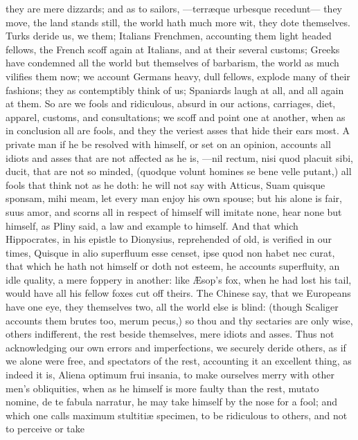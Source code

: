 {they are mere dizzards; and as to sailors, ---terr\ae{}que urbesque
recedunt--- they move, the land stands still, the world hath much more
wit, they dote themselves. Turks deride us, we them; Italians
Frenchmen, accounting them light headed fellows, the French scoff again
at Italians, and at their several customs; Greeks have condemned all
the world but themselves of barbarism, the world as much vilifies them
now; we account Germans heavy, dull fellows, explode many of their
fashions; they as contemptibly think of us; Spaniards laugh at all, and
all again at them. So are we fools and ridiculous, absurd in our
actions, carriages, diet, apparel, customs, and consultations; we 
scoff and point one at another, when as in conclusion all are fools,
 and they the veriest asses that hide their ears most. A private
man if he be resolved with himself, or set on an opinion, accounts all
idiots and asses that are not affected as he is, ---nil rectum,
nisi quod placuit sibi, ducit, that are not so minded, (quodque
volunt homines se bene velle putant,) all fools that think not as he
doth: he will not say with Atticus, Suam quisque sponsam, mihi meam,
let every man enjoy his own spouse; but his alone is fair, suus amor,
\etc{} and scorns all in respect of himself will imitate none, hear
none but himself, as Pliny said, a law and example to himself. And
that which Hippocrates, in his epistle to Dionysius, reprehended of
old, is verified in our times, Quisque in alio superfluum esse censet,
ipse quod non habet nec curat, that which he hath not himself or doth
not esteem, he accounts superfluity, an idle quality, a mere foppery in
another: like \AE{}sop's fox, when he had lost his tail, would have all
his fellow foxes cut off theirs. The Chinese say, that we Europeans
have one eye, they themselves two, all the world else is blind: (though
Scaliger accounts them brutes too, merum pecus,) so thou and thy
sectaries are only wise, others indifferent, the rest beside
themselves, mere idiots and asses. Thus not acknowledging our own
errors and imperfections, we securely deride others, as if we alone
were free, and spectators of the rest, accounting it an excellent
thing, as indeed it is, Aliena optimum frui insania, to make ourselves
merry with other men's obliquities, when as he himself is more faulty
than the rest, mutato nomine, de te fabula narratur, he may take
himself by the nose for a fool; and which one calls maximum stultiti\ae{}
specimen, to be ridiculous to others, and not to perceive or take
}
